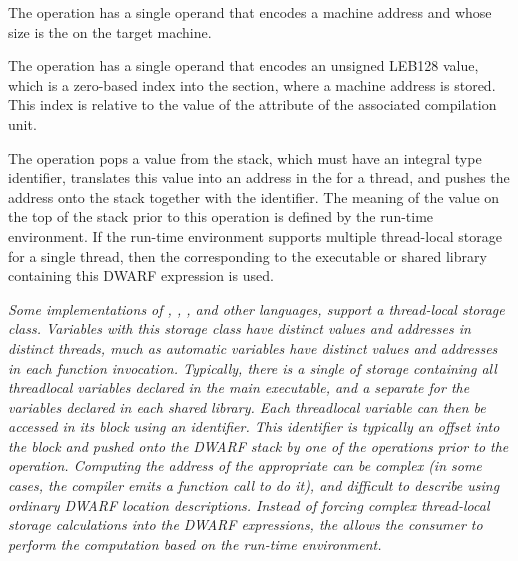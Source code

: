 \begin{enumerate}[1. ]

\itembfnl{\DWOPaddrTARG}
The \DWOPaddrNAME{} operation has a single operand that encodes
a machine address and whose size is the 
on the target machine.

\itembfnl{\DWOPaddrxTARG}
The \DWOPaddrxNAME{} operation has a single operand that
encodes an unsigned LEB128 value,
which is a zero-based index into the \dotdebugaddr{} section,
where a machine address is stored.
This index is relative to the value of the
\DWATaddrbase{} attribute of the associated compilation unit.

\itembfnl{\DWOPformtlsaddressTARG}
The \DWOPformtlsaddressNAME{}
operation pops a value from the stack, which must have an
integral type identifier, translates this
value into an address in the
for a thread, and pushes the address
onto the stack together with the \generictype{} identifier.
The meaning of the value on the top of the stack prior to this
operation is defined by the run-time environment.  If the run-time
environment supports multiple thread-local storage
 for a single thread, then the 
corresponding to the executable or shared
library containing this DWARF expression is used.

\textit{Some implementations of
, , , and other
languages, support a
thread-local storage class. Variables with this storage class
have distinct values and addresses in distinct threads, much
as automatic variables have distinct values and addresses in
each function invocation. Typically, there is a single 
of storage containing all thread\dash local variables declared in
the main executable, and a separate  for the variables
declared in each shared library. Each
thread\dash local variable can then be accessed in its block using an
identifier. This identifier is typically an offset into the block and
pushed onto the DWARF stack by one of the
\DWOPconstnx{} operations prior to the
\DWOPformtlsaddress{} operation.
Computing the address of
the appropriate  can be complex (in some cases, the
compiler emits a function call to do it), and difficult
to describe using ordinary DWARF location descriptions.
Instead of    forcing complex thread-local storage calculations into
the DWARF expressions, the \DWOPformtlsaddress{} allows the consumer
to perform the computation based on the run-time environment.}


\end{enumerate}
